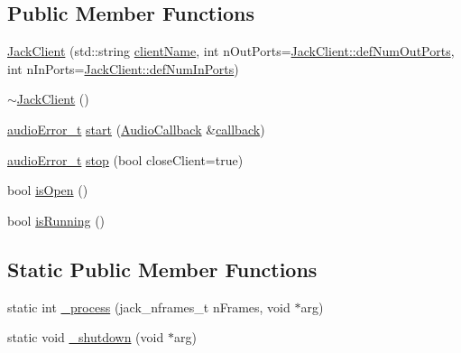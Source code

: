 \subsection*{Public Member Functions}
\begin{DoxyCompactItemize}
\item 
\hyperlink{classdrumpi_1_1audio_1_1JackClient_ab4cf3d533282d89dc9e1be8a64e22676}{Jack\+Client} (std\+::string \hyperlink{classdrumpi_1_1audio_1_1JackClient_a8b43d4d05f5afaeb3104b0b7f325688c}{client\+Name}, int n\+Out\+Ports=\hyperlink{classdrumpi_1_1audio_1_1JackClient_a4041995639d6765bb34dbadf27f7c3ec}{Jack\+Client\+::def\+Num\+Out\+Ports}, int n\+In\+Ports=\hyperlink{classdrumpi_1_1audio_1_1JackClient_abffcd237af5b33cb60bc93f4c0af3efa}{Jack\+Client\+::def\+Num\+In\+Ports})
\item 
\hyperlink{classdrumpi_1_1audio_1_1JackClient_ad9866ad3521128ca3a967aa96922ea97}{$\sim$\+Jack\+Client} ()
\item 
\hyperlink{namespacedrumpi_1_1audio_ac19e3be3b59052606a02605a7ee26f05}{audio\+Error\+\_\+t} \hyperlink{classdrumpi_1_1audio_1_1JackClient_ab76c081f0442dbe7ba23ab4715e11256}{start} (\hyperlink{classdrumpi_1_1audio_1_1AudioCallback}{Audio\+Callback} \&\hyperlink{classdrumpi_1_1audio_1_1JackClient_a607ea3c9f3b94f006db0abbf6382d6ac}{callback})
\item 
\hyperlink{namespacedrumpi_1_1audio_ac19e3be3b59052606a02605a7ee26f05}{audio\+Error\+\_\+t} \hyperlink{classdrumpi_1_1audio_1_1JackClient_aa4e28932809e94d3ee9ec02e19dac26d}{stop} (bool close\+Client=true)
\item 
bool \hyperlink{classdrumpi_1_1audio_1_1JackClient_a3b27776cda219ea706e77e96138b4c4e}{is\+Open} ()
\item 
bool \hyperlink{classdrumpi_1_1audio_1_1JackClient_ab5c76d2572a326d063761b6d8ec4d279}{is\+Running} ()
\end{DoxyCompactItemize}
\subsection*{Static Public Member Functions}
\begin{DoxyCompactItemize}
\item 
static int \hyperlink{classdrumpi_1_1audio_1_1JackClient_a70029f7ae102eba6b9b6a3160141d622}{\+\_\+process} (jack\+\_\+nframes\+\_\+t n\+Frames, void $\ast$arg)
\item 
static void \hyperlink{classdrumpi_1_1audio_1_1JackClient_ab3ec8c68b5c4473cdd3c53dc8f51b7c1}{\+\_\+shutdown} (void $\ast$arg)
\end{DoxyCompactItemize}
